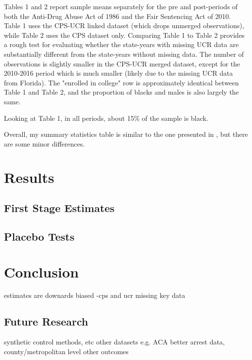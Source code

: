 \documentclass{article}
\begin{document}
Tables 1 and 2 report sample means separately for the pre and post-periods of both the Anti-Drug Abuse Act of 1986 and the Fair Sentencing Act of 2010. Table 1 uses the CPS-UCR linked dataset (which drops unmerged observations), while Table 2 uses the CPS dataset only. Comparing Table 1 to Table 2 provides a rough test for evaluating whether the state-years with missing UCR data are substantially different from the state-years without missing data. The number of observations is slightly smaller in the CPS-UCR merged dataset, except for the 2010-2016 period which is much smaller (likely due to the missing UCR data from Florida). The "enrolled in college" row is approximately identical between Table 1 and Table 2, and the proportion of blacks and males is also largely the same.

Looking at Table 1, in all periods, about 15\% of the sample is black.

Overall, my summary statistics table is similar to the one presented in \cite{britton2022}, but there are some minor differences.

\section{Results}

\subsection{First Stage Estimates}

\subsection{Placebo Tests}

\section{Conclusion}

estimates are downards biased -cps and ucr missing key data

\subsection{Future Research}
synthetic control methods, etc
other datasets e.g. ACA
better arrest data, county/metropolitan level
other outcomes



\end{document}
